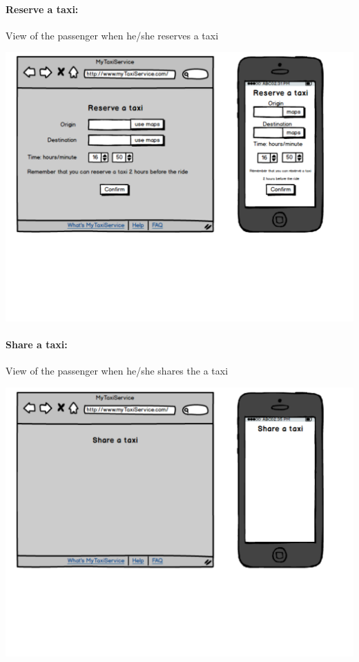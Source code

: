 \paragraph{Reserve a taxi:}
View of the passenger when he/she reserves a taxi
\begin{center}
	\includegraphics[width=\textwidth]{mockup/reserve.pdf}
\end{center}

\paragraph{Share a taxi:}
View of the passenger when he/she shares the a taxi
\begin{center}
	\includegraphics[width=\textwidth]{mockup/share.pdf}
\end{center}

